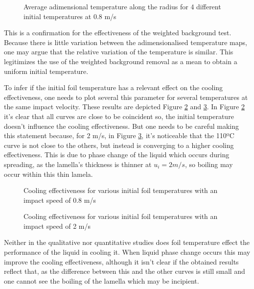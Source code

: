 \begin{figure}[h]
\centering
\subfigure[3 ms]{}
\subfigure[13 ms]{}
\subfigure[23 ms]{}
\caption{Average adimensional temperature along the radius for 4 different initial temperatures at 0.8 m/s}
\label{fig:temp}
\end{figure}

\par This is a confirmation for the effectiveness of the  weighted background test. Because there is little variation between the adimensionalised temperature maps, one may argue that the relative variation of the temperature is similar. This legitimizes the use of the weighted background removal as a mean to obtain a uniform initial temperature.\\

\par To infer if the initial foil temperature has a relevant effect on the cooling effectiveness, one needs to plot several this parameter for several temperatures at the same impact velocity. These results are depicted Figure \ref{fig:tempcool} and \ref{fig:tempcool2}. In Figure \ref{fig:tempcool} it's clear that all curves are close to be coincident so, the initial temperature doesn't influence the cooling effectiveness. But one needs to be careful making this statement because, for 2 m/s, in Figure \ref{fig:tempcool2}, it's noticeable that the 110ºC curve is not close to the others, but instead is converging to a higher cooling effectiveness. This is due to phase change of the liquid which occurs during spreading, as the lamella's thickness is thinner at $u_i=2 m/s$, so boiling may occur within this thin lamela.\\

\begin{figure}[h!]
\centering

\caption{Cooling effectiveness for various initial foil temperatures with an impact speed of 0.8 m/s}
\label{fig:tempcool}
\end{figure}

\begin{figure}[h!]
\centering

\caption{Cooling effectiveness for various initial foil temperatures with an impact speed of 2 m/s}
\label{fig:tempcool2}
\end{figure}

\par Neither in the qualitative nor quantitative studies does foil temperature effect the performance of the liquid in cooling it. When liquid phase change occurs this may improve the cooling effectiveness, although it isn't clear if the obtained results reflect that, as the difference between this and the other curves is still small and one cannot see the boiling of the lamella which may be incipient.


